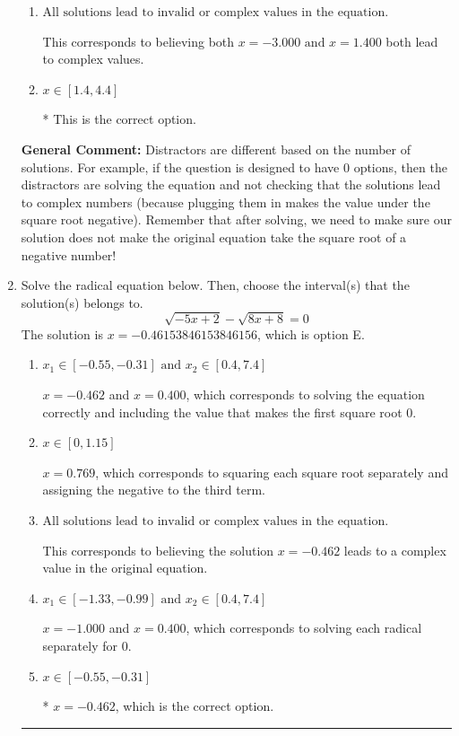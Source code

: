 \documentclass{extbook}[14pt]
\newcommand{\litem}[1]{\item #1

\rule{\textwidth}{0.4pt}}
\begin{document}
\begin{enumerate}
{\begin{enumerate}[label=\Alph*.]
$x = -3.000 \text{ and } x = 1.400$, which corresponds to not checking that $x = -3.000$ leads to a negative in at least one of the radicands.
\item \( \text{All solutions lead to invalid or complex values in the equation.} \)

This corresponds to believing both $x = -3.000 \text{ and } x = 1.400$ both lead to complex values.
\item \( x \in [1.4,4.4] \)

* This is the correct option.
\end{enumerate}

\textbf{General Comment:} Distractors are different based on the number of solutions. For example, if the question is designed to have 0 options, then the distractors are solving the equation and not checking that the solutions lead to complex numbers (because plugging them in makes the value under the square root negative). Remember that after solving, we need to make sure our solution does not make the original equation take the square root of a negative number!
}
\litem{
Solve the radical equation below. Then, choose the interval(s) that the solution(s) belongs to.
\[ \sqrt{-5 x + 2} - \sqrt{8 x + 8} = 0 \]The solution is \( x = -0.46153846153846156 \), which is option E.\begin{enumerate}[label=\Alph*.]
\item \( x_1 \in [-0.55, -0.31] \text{ and } x_2 \in [0.4,7.4] \)

$x = -0.462$ and $x = 0.400$, which corresponds to solving the equation correctly and including the value that makes the first square root 0.
\item \( x \in [0,1.15] \)

$x = 0.769$, which corresponds to squaring each square root separately and assigning the negative to the third term.
\item \( \text{All solutions lead to invalid or complex values in the equation.} \)

This corresponds to believing the solution $x = -0.462$ leads to a complex value in the original equation.
\item \( x_1 \in [-1.33, -0.99] \text{ and } x_2 \in [0.4,7.4] \)

$x = -1.000$ and $x = 0.400$, which corresponds to solving each radical separately for 0.
\item \( x \in [-0.55,-0.31] \)

* $x = -0.462$, which is the correct option.
\end{enumerate}

}
\end{enumerate}
\end{document}
